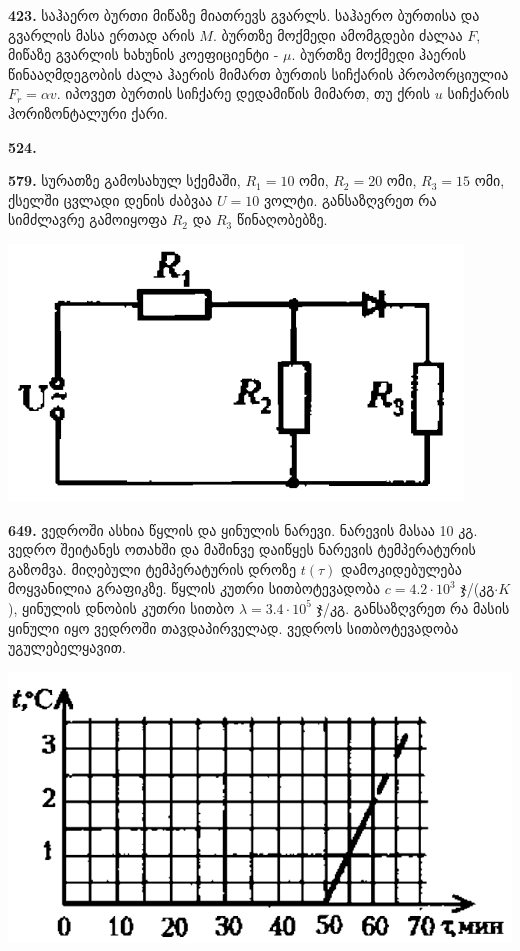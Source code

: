 \documentclass[12pt,a4paper,]{report}
\begin{document}
\textbf{423.} საჰაერო ბურთი მიწაზე მიათრევს გვარლს. საჰაერო ბურთისა და გვარლის მასა ერთად არის $M$. ბურთზე მოქმედი ამომგდები ძალაა $F$, მიწაზე გვარლის ხახუნის კოეფიციენტი - $\mu$. ბურთზე მოქმედი ჰაერის წინააღმდეგობის ძალა ჰაერის მიმართ ბურთის სიჩქარის პროპორციულია $F_r=\alpha v$. იპოვეთ ბურთის სიჩქარე დედამიწის მიმართ, თუ ქრის $u$ სიჩქარის ჰორიზონტალური ქარი.

\textbf{524.} 

\textbf{579.} სურათზე გამოსახულ სქემაში, $R_1=10$ ომი, $R_2=20$ ომი, $R_3=15$ ომი, ქსელში ცვლადი დენის ძაბვაა $U=10$ ვოლტი. განსაზღვრეთ რა სიმძლავრე გამოიყოფა $R_2$ და $R_3$ წინაღობებზე. 
		\begin{center}
			\includegraphics[scale=0.5]{images/F579.png}
		\end{center}
	
\textbf{649.} ვედროში ასხია წყლის და ყინულის ნარევი. ნარევის მასაა 10 კგ. ვედრო შეიტანეს ოთახში და მაშინვე დაიწყეს ნარევის ტემპერატურის გაზომვა. მიღებული ტემპერატურის დროზე $t(\tau)$ დამოკიდებულება მოყვანილია გრაფიკზე. წყლის კუთრი სითბოტევადობა $c=4.2\cdot10^3$ ჯ/(კგ$\cdot K$), ყინულის დნობის კუთრი სითბო $\lambda=3.4\cdot10^5$ ჯ/კგ. განსაზღვრეთ რა მასის ყინული იყო ვედროში თავდაპირველად. ვედროს სითბოტევადობა უგულებელყავით. 
		\begin{center}
			\includegraphics[scale=0.5]{images/F649.png}
		\end{center}
\end{document}
